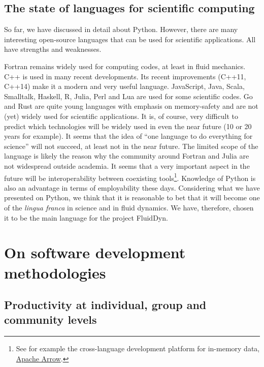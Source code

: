 \subsection{The state of languages for scientific computing}

So far, we have discussed in detail about Python. However, there are many
interesting open-source languages that can be used for scientific applications.
All have strengths and weaknesses.

Fortran remains widely used for computing codes, at least in fluid mechanics.
C++ is used in many recent developments. Its recent improvements (C++11, C++14)
make it a modern and very useful language.
%
JavaScript, Java, Scala, Smalltalk, Haskell, R, Julia, Perl and Lua are used for
some scientific codes. Go and Rust are quite young languages with emphasis on
memory-safety and are not (yet) widely used for scientific applications.
%
It is, of course, very difficult to predict which technologies will be widely
used in even the near future (10 or 20 years for example).
%
It seems that the idea of ``one language to do everything for science'' will
not succeed, at least not in the near future. 
%
The limited scope of the language is likely the reason why the community
around Fortran and Julia are not widespread outside academia.
%
It seems that a very important aspect in the future will be interoperability
between coexisting tools\footnote{See for example the cross-language development
platform for in-memory data, \href{https://arrow.apache.org/}{Apache Arrow}.}.
%
Knowledge of Python is also an advantage in terms of employability these days.
%
Considering what we have presented on Python, we think that it is reasonable to
bet that it will become one of the \textit{lingua franca} in science and in
fluid dynamics.
%
We have, therefore, chosen it to be the main language for the project FluidDyn.

\section{On software development methodologies}

\subsection{Productivity at individual, group and community levels}

